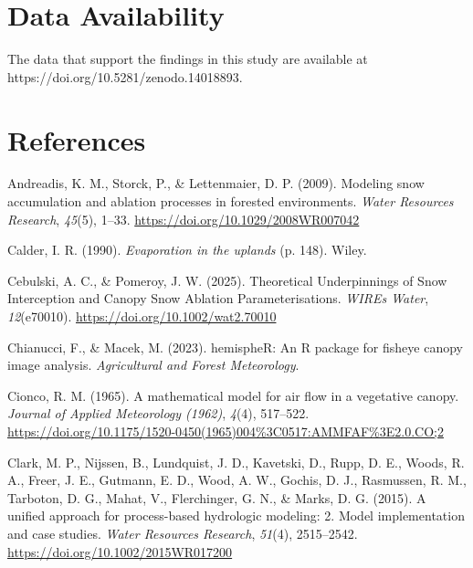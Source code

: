 \documentclass[
  letterpaper,
  DIV=11,
  numbers=noendperiod]{scrartcl}
\newlength{\cslhangindent}
\newenvironment{CSLReferences}[2] %
 {\begin{list}{}{%
  \setlength{\itemindent}{0pt}
  \setlength{\leftmargin}{0pt}
  \setlength{\parsep}{0pt}
  \ifodd #1
   \setlength{\leftmargin}{\cslhangindent}
   \setlength{\itemindent}{-1\cslhangindent}
  \fi
  \setlength{\itemsep}{#2\baselineskip}}}
 {\end{list}}
\begin{document}
\section{Data Availability}\label{data-availability}

The data that support the findings in this study are available at
https://doi.org/10.5281/zenodo.14018893.

\pagebreak

\section*{References}\label{references}

\label{refs}
\begin{CSLReferences}{1}{0}
Andreadis, K. M., Storck, P., \& Lettenmaier, D. P. (2009). Modeling
snow accumulation and ablation processes in forested environments.
\emph{Water Resources Research}, \emph{45}(5), 1--33.
\url{https://doi.org/10.1029/2008WR007042}

Calder, I. R. (1990). \emph{Evaporation in the uplands} (p. 148). Wiley.

Cebulski, A. C., \& Pomeroy, J. W. (2025). Theoretical {Underpinnings}
of {Snow Interception} and {Canopy Snow Ablation Parameterisations}.
\emph{WIREs Water}, \emph{12}(e70010).
\url{https://doi.org/10.1002/wat2.70010}

Chianucci, F., \& Macek, M. (2023). {hemispheR}: An {R} package for
fisheye canopy image analysis. \emph{Agricultural and Forest
Meteorology}.

Cionco, R. M. (1965). A mathematical model for air flow in a vegetative
canopy. \emph{Journal of Applied Meteorology (1962)}, \emph{4}(4),
517--522.
\url{https://doi.org/10.1175/1520-0450(1965)004\%3C0517:AMMFAF\%3E2.0.CO;2}

Clark, M. P., Nijssen, B., Lundquist, J. D., Kavetski, D., Rupp, D. E.,
Woods, R. A., Freer, J. E., Gutmann, E. D., Wood, A. W., Gochis, D. J.,
Rasmussen, R. M., Tarboton, D. G., Mahat, V., Flerchinger, G. N., \&
Marks, D. G. (2015). A unified approach for process-based hydrologic
modeling: 2. {Model} implementation and case studies. \emph{Water
Resources Research}, \emph{51}(4), 2515--2542.
\url{https://doi.org/10.1002/2015WR017200}


\end{CSLReferences}
\end{document}
